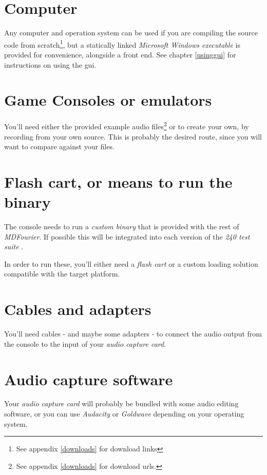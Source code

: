 \documentclass[10pt,a4paper]{report}
\begin{document}
\begin{appendices}
\section{Computer}

Any computer and operation system can be used if you are compiling the source code from scratch\footnote{See appendix \ref{downloads} for download links}, but a statically linked \textit{Microsoft Windows executable} is provided for convenience, alongside a front end. See chapter \ref{usinggui} for instructions on using the \acrshort{gui}.

\section{Game Consoles or emulators}

You'll need either the provided example audio files\footnote{See appendix \ref{downloads} for download urls.} or to create your own, by recording from your own source. This is probably the desired route, since you will want to compare against your files.

\section{Flash cart, or means to run the binary}

The console needs to run a \textit{custom binary} that is provided with the rest of \textit{MDFourier}. If possible this will be integrated into each version of the \textit{240 test suite} \cite{240pSuite}.

In order to run these, you'll either need a \textit{flash cart} or a custom loading solution compatible with the target platform.

\section{Cables and adapters}

You'll need cables - and maybe some adapters - to connect the audio output from the console to the input of your \textit{audio capture card}.

\section{Audio capture software}

Your \textit{audio capture card} will probably be bundled with some audio editing software, or you can use \textit{Audacity} \cite{audacity} or \textit{Goldwave} \cite{goldwave} depending on your operating system.


\end{appendices}
\end{document}
